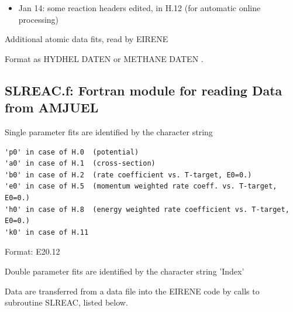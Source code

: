 \documentclass[12pt,dvips]{article}
\begin{document}
\begin{itemize}
  2.) revised H.8 and H.11 for Ar and C ionisation, (constant electron energy loss=ionisation potential,
  to derive electron cooling fits H.8 and H.11 from those for rate coefficients H.2\\
  3.) new H.2 rate coeff. added for N2 and N2+:        \\
  H.2 2.7.5, 2.7.9, 2.7.10, 2.7.11, 2.7.12, 2.7.15
  do be done: plots, and 2.7.14 (Dissociative recombination)\\
  checked: e+N ionisation. cross-section Bell and Brooks are identical.
  Checked: rate coefficients H.2  2.7, 2.7B0 are identical too.
  (hence: rate coeffs. should also be identical to open ADAS).
  further checks:
  H.4 e + N vs. H.2 e + N?? Is the ADAS corona limit correct?, see plot for H.4 rate coeff.,
  label of red curve incorrect on this plot
  \item Jan 14:  some reaction headers  edited, in H.12 (for automatic online processing)
\end{itemize}
\newpage
Additional atomic data fits, read by EIRENE

Format as HYDHEL DATEN \cite{kn:Janev}
or METHANE DATEN \cite{kn:Ehrhardt}.
\newpage

\subsection*{SLREAC.f: Fortran module for reading Data from AMJUEL}
Single parameter fits are identified by the character string
\begin{small}\begin{verbatim}
'p0' in case of H.0  (potential)
'a0' in case of H.1  (cross-section)
'b0' in case of H.2  (rate coefficient vs. T-target, E0=0.)
'e0' in case of H.5  (momentum weighted rate coeff. vs. T-target, E0=0.)
'h0' in case of H.8  (energy weighted rate coefficient vs. T-target, E0=0.)
'k0' in case of H.11
\end{verbatim}\end{small}
Format: E20.12

Double parameter fits are identified by the character string
'Index'


Data are transferred from a data file into the EIRENE code by
calls to subroutine SLREAC, listed below.
\end{document}

